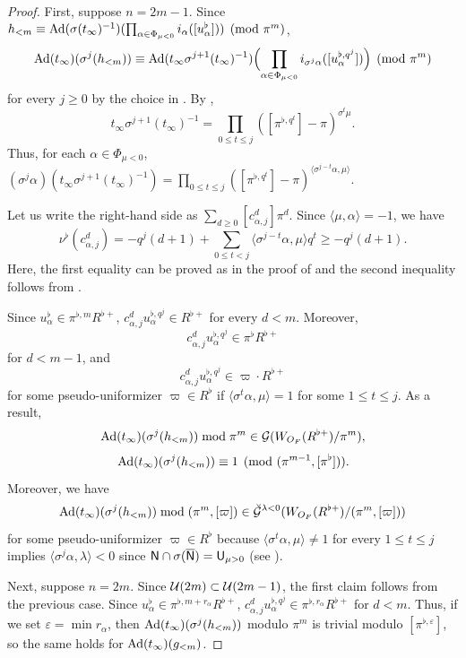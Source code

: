 \documentclass[12pt,reqno]{amsart}
\begin{document}
\begin{proof}
    First, suppose $n = 2m - 1$. Since $h_{<m} \equiv {\operatorname{Ad}}(\sigma(t_\infty)^{-1})(\prod_{\alpha \in \Phi_{\mu<0}} i_\alpha([u_\alpha^\flat])) \pmod{\pi^m}$, 
    \[
        {\operatorname{Ad}}(t_\infty)(\sigma^j(h_{<m})) \equiv {\operatorname{Ad}}(t_\infty \sigma^{j+1}(t_\infty)^{-1})\Bigl(\prod_{\alpha \in \Phi_{\mu<0}} i_{\sigma^j\alpha}([u_\alpha^{\flat, q^j}])\Bigr) \pmod{\pi^m}
    \]
    for every $j \geq 0$ by the choice in . By , 
    \[
        t_\infty \sigma^{j+1}(t_\infty)^{-1}  = \prod_{0 \leq t \leq j} ([\pi^{\flat, q^t}] - \pi)^{\sigma^t \mu}. 
    \]
    Thus, for each $\alpha \in \Phi_{\mu<0}$, $(\sigma^j\alpha)( t_\infty \sigma^{j+1}(t_\infty)^{-1}) = \prod_{0 \leq t \leq j} ([\pi^{\flat, q^t}] - \pi)^{\langle \sigma^{j - t} \alpha, \mu \rangle}$. 
    
    Let us write the right-hand side as $\sum_{d \geq 0} [c_{\alpha,j}^d] \pi^d$. Since $\langle \mu, \alpha \rangle = -1$, we have
    \[
        \nu^\flat(c_{\alpha,j}^d) =  - q^j(d + 1) + \sum_{0 \leq t < j} \langle \sigma^{j - t}  \alpha, \mu \rangle q^t \geq -q^j(d+1). 
    \]
    Here, the first equality can be proved as in the proof of  and the second inequality follows from . 
    
    Since $u_\alpha^\flat \in \pi^{\flat, m} R^{\flat+}$, $c_{\alpha,j}^d u_{\alpha}^{\flat, q^j} \in R^{\flat +}$ for every $d < m$. Moreover, 
    \[
        c_{\alpha,j}^d u_{\alpha}^{\flat, q^j} \in \pi^{\flat} R^{\flat +}
    \]
    for $d < m-1$, and 
    \[
        c_{\alpha,j}^d u_{\alpha}^{\flat, q^j} \in \varpi \cdot R^{\flat +}
    \]
    for some pseudo-uniformizer $\varpi \in R^\flat$ if $\langle \sigma^{t} \alpha, \mu \rangle = 1$ for some $1 \leq t \leq j$. As a result,
    \[
        {\operatorname{Ad}}(t_\infty)(\sigma^j(h_{<m})) \bmod{\pi^m} \in {\mathcal{G}}(W_{O_F}(R^{\flat+})/\pi^{m}) ,
    \]
    \[
        {\operatorname{Ad}}(t_\infty)(\sigma^j(h_{<m})) \equiv 1 \pmod{(\pi^{m-1}, [\pi^{\flat}])}. 
    \]
    Moreover, we have 
    \[
        {\operatorname{Ad}}(t_\infty)(\sigma^j(h_{<m})) \bmod{(\pi^m, [\varpi])} \in \breve{{\mathcal{G}}}^{\lambda < 0}(W_{O_F}(R^{\flat+})/(\pi^m, [\varpi]))
    \]
    for some pseudo-uniformizer $\varpi \in R^\flat$ because $\langle \sigma^{t} \alpha, \mu \rangle \neq 1$ for every $1 \leq t \leq j$ implies $\langle \sigma^j \alpha, \lambda \rangle < 0$ since ${\mathsf{N}} \cap \sigma({\mathsf{{\overline{N}}}}) = {\mathsf{U}}_{\mu > 0}$ (see ). 
    
    Next, suppose $n = 2m$. Since ${\mathcal{U}}(2m) \subset {\mathcal{U}}(2m - 1)$, the first claim follows from the previous case. Since $u_\alpha^\flat \in \pi^{\flat, m + r_\alpha} R^{\flat+}$, $c_{\alpha,j}^d u_{\alpha}^{\flat, q^j} \in \pi^{\flat, r_\alpha} R^{\flat +}$ for $d < m$. Thus, if we set $\varepsilon = \min r_\alpha$, then ${\operatorname{Ad}}(t_\infty)(\sigma^j(h_{<m}))$ modulo $\pi^m$ is trivial modulo $[\pi^{\flat, \varepsilon}]$, so the same holds for ${\operatorname{Ad}}(t_\infty)(g_{<m})$. 
\end{proof}
\end{document}
